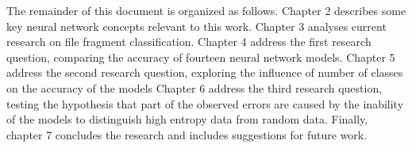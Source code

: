 
The remainder of this document is organized as follows.
    Chapter 2 describes some key neural network concepts relevant to this work. 
    Chapter 3 analyses current research on file fragment classification.
    Chapter 4 address the first research question, comparing the accuracy of fourteen neural network models.
    Chapter 5 address the second research question, exploring the influence of number of classes on the accuracy of the models
    Chapter 6 address the third research question, testing the hypothesis that part of the observed errors are caused by the inability of the models to distinguish high entropy data from random data.    
    Finally, chapter 7 concludes the research and includes suggestions for future work.
